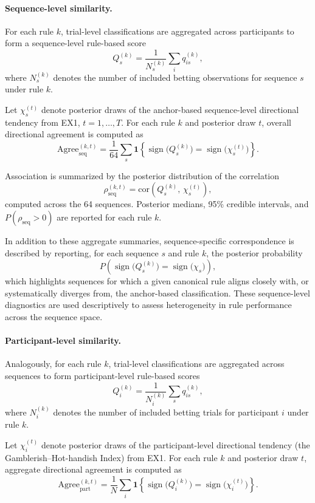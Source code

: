 \documentclass[11pt,a4paper]{article}
\numberwithin{equation}{section}
\begin{document}
\paragraph{Sequence-level similarity.}
For each rule $k$, trial-level classifications are aggregated across participants
to form a sequence-level rule-based score
\[
Q^{(k)}_{s} = \frac{1}{N_s^{(k)}}\sum_i q^{(k)}_{is},
\]
where $N_s^{(k)}$ denotes the number of included betting observations for sequence
$s$ under rule $k$.

Let $\chi_s^{(t)}$ denote posterior draws of the anchor-based sequence-level
directional tendency from EX1, $t=1,\dots,T$.
For each rule $k$ and posterior draw $t$, overall directional agreement is computed as
\[
\mathrm{Agree}^{(k,t)}_{\mathrm{seq}}
=
\frac{1}{64}\sum_s
\mathbf{1}\!\left\{
\operatorname{sign}\!\big(Q^{(k)}_{s}\big)
=
\operatorname{sign}\!\big(\chi_s^{(t)}\big)
\right\}.
\]

Association is summarized by the posterior distribution of the correlation
\[
\rho^{(k,t)}_{\mathrm{seq}}
=
\mathrm{cor}\!\left(Q^{(k)}_{s},\,\chi_s^{(t)}\right),
\]
computed across the 64 sequences.
Posterior medians, 95\% credible intervals, and $P(\rho_{\mathrm{seq}}>0)$ are
reported for each rule $k$.

In addition to these aggregate summaries, sequence-specific correspondence is
described by reporting, for each sequence $s$ and rule $k$, the posterior
probability
\[
P\!\left(
\operatorname{sign}\!\big(Q^{(k)}_{s}\big)
=
\operatorname{sign}\!\big(\chi_s\big)
\right),
\]
which highlights sequences for which a given canonical rule aligns closely with,
or systematically diverges from, the anchor-based classification. These
sequence-level diagnostics are used descriptively to assess heterogeneity in rule
performance across the sequence space.

\paragraph{Participant-level similarity.}
Analogously, for each rule $k$, trial-level classifications are aggregated across
sequences to form participant-level rule-based scores
\[
Q^{(k)}_{i} = \frac{1}{N_i^{(k)}}\sum_s q^{(k)}_{is},
\]
where $N_i^{(k)}$ denotes the number of included betting trials for participant
$i$ under rule $k$.

Let $\chi_i^{(t)}$ denote posterior draws of the participant-level directional
tendency (the Gamblerish--Hot-handish Index) from EX1.
For each rule $k$ and posterior draw $t$, aggregate directional agreement is computed as
\[
\mathrm{Agree}^{(k,t)}_{\mathrm{part}}
=
\frac{1}{N}\sum_i
\mathbf{1}\!\left\{
\operatorname{sign}\!\big(Q^{(k)}_{i}\big)
=
\operatorname{sign}\!\big(\chi_i^{(t)}\big)
\right\}.
\]
\end{document}
